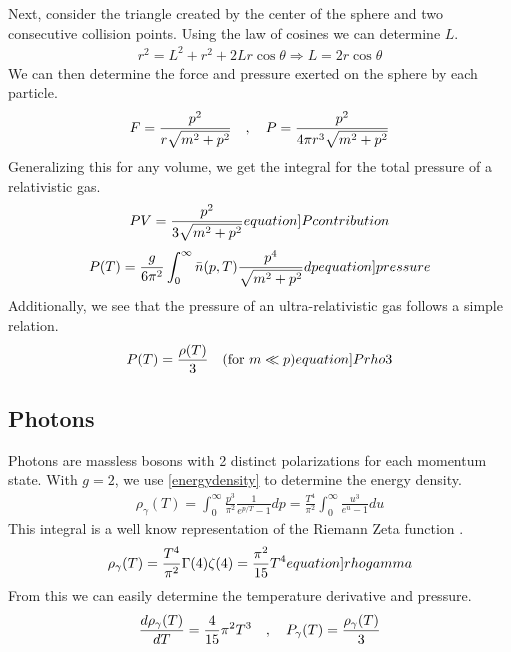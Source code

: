 Next, consider the triangle created by the center of the sphere and two consecutive collision points. Using the law of cosines we can determine $L$.
\begin{align}
    r^2=L^2+r^2+2L r \cos \theta \Rightarrow
    L = 2r \cos \theta
\end{align}
We can then determine the force and pressure exerted on the sphere by each particle. 
\begin{align}
    F = \frac{p^2}{r\sqrt{m^2+p^2}} \quad , \quad P = \frac{p^2}{4\pi r^3\sqrt{m^2+p^2}}
\end{align}
Generalizing this for any volume, we get the integral for the total pressure of a relativistic gas.
\begin{align}
    PV=\frac{p^2}{3\sqrt{m^2+p^2}} 
    \label[equation]{Pcontribution}
\end{align}
\begin{align}
    P(T)=\frac{g}{6\pi^2}\int_{0}^{\infty}\bar{n}(p,T)\frac{p^4}{\sqrt{m^2+p^2}}dp
    \label[equation]{pressure}
\end{align}
Additionally, we see that the pressure of an ultra-relativistic gas follows a simple relation.
\begin{align}
    P(T)=\frac{\rho(T)}{3} \quad (\text{for } m\ll p)
    \label[equation]{Prho3}
\end{align}

\subsection{Photons}


Photons are massless bosons with 2 distinct polarizations for each momentum state. With $g=2$, we use \ref{energydensity} to determine the energy density. 
\begin{align}
    \rho_\gamma(T)=\int_{0}^{\infty} \frac{p^3}{\pi^2}\frac{1}{e^{p/T}-1}dp =  \frac{T^4}{\pi^2}\int_{0}^{\infty}\frac{u^3}{e^{u}-1}du
\end{align}
This integral is a well know representation of the Riemann Zeta function \cite[\href{https://dlmf.nist.gov/25.5.E1}{(25.5.1)}]{NIST:DLMF}.
\begin{align}
    \rho_\gamma(T)=\frac{T^4}{\pi^2}\Gamma(4)\zeta(4)=\frac{\pi^2}{15}T^4
    \label[equation]{rhogamma}
\end{align}
From this we can easily determine the temperature derivative and pressure.
\begin{align}
    \frac{d\rho_\gamma(T)}{dT}=\frac{4}{15}\pi^2T^3 \quad , \quad P_\gamma(T)=\frac{\rho_\gamma(T)}{3}
\end{align}




